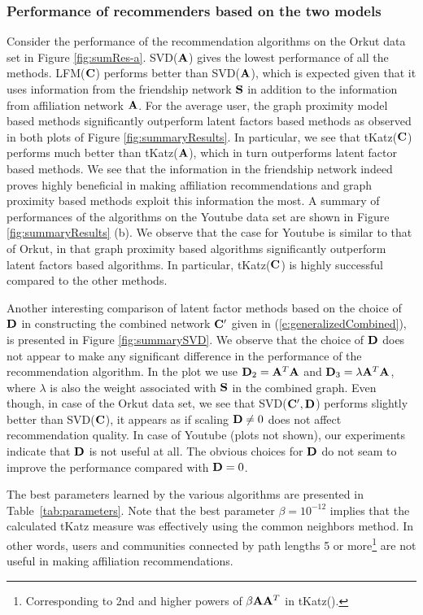 \subsubsection{Performance of recommenders based on the two models}
Consider the performance of the recommendation algorithms on the Orkut data set in Figure \ref{fig:sumRes-a}. SVD($\mathbf{A}$) gives the lowest performance of all the methods. LFM($\mathbf{C}$) performs better than SVD($\mathbf{A}$), which is expected given that it uses information from the friendship network $\mathbf{S}$ in addition to the information from affiliation network $\mathbf{A}$. For the average user, the graph proximity model based methods significantly outperform latent factors based methods as observed in both plots of Figure \ref{fig:summaryResults}. In particular, we see that \textsf{tKatz}($\mathbf{C}$) performs much better than \textsf{tKatz}($\mathbf{A}$), which in turn outperforms latent factor based methods. We see that the information in the friendship network indeed proves highly beneficial in making affiliation recommendations and graph proximity based methods exploit this information the most. A summary of performances of the algorithms on the Youtube data set are shown in Figure \ref{fig:summaryResults} (b). We observe that the case for Youtube is similar to that of Orkut, in that graph proximity based algorithms significantly outperform latent factors based algorithms. In particular, \textsf{tKatz}($\mathbf{C}$) is highly successful compared to the other methods. 


Another interesting comparison of latent factor methods based on the choice of $\mathbf{D}$ in constructing the combined network $\mathbf{C}'$ given in (\ref{e:generalizedCombined}), is presented in Figure \ref{fig:summarySVD}. We observe that the choice of $\mathbf{D}$ does not appear to make any significant difference in the performance of the recommendation algorithm. In the plot we use $\mathbf{D}_2 = \mathbf{A}^{T}\mathbf{A}$ and $\mathbf{D}_3 = \lambda \mathbf{A}^{T}\mathbf{A}$, where $\lambda$ is also the weight associated with $\mathbf{S}$ in the combined graph. Even though, in case of the Orkut data set, we see that SVD($\mathbf{C}', \mathbf{D}$) performs slightly better than SVD($\mathbf{C}$), it appears as if scaling $\mathbf{D} \neq 0$ does not affect recommendation quality. In case of Youtube (plots not shown), our experiments indicate that $\mathbf{D}$ is not useful at all. The obvious choices for $\mathbf{D}$ do not seam to improve the performance compared with $\mathbf{D} = 0$.


The best parameters learned by the various algorithms are presented in Table~\ref{tab:parameters}. Note that the best parameter $\beta = 10^{-12}$ implies that the calculated \textsf{tKatz} measure was effectively using the common neighbors method. In other words, users and communities connected by path lengths 5 or more\footnote{Corresponding to 2nd and higher powers of $\beta \mathbf{A}\mathbf{A}^{T}$ in \textsf{tKatz}(\A).} are not useful in making affiliation recommendations.

